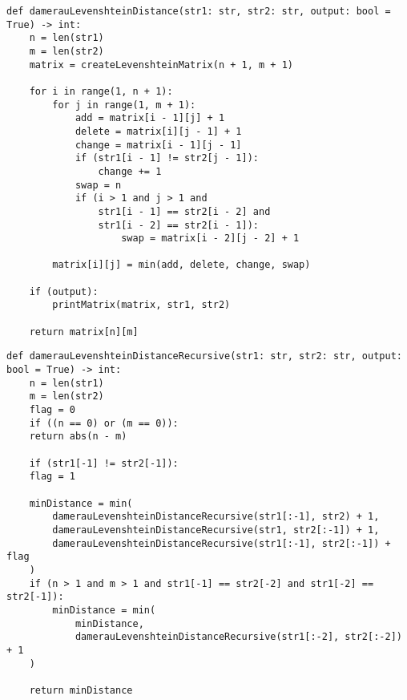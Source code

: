 \begin{center}
    \captionsetup{justification=raggedright,singlelinecheck=off}
    \begin{lstlisting}[label=lst:dam_lev_mat,caption=Реализация алгоритма нахождения расстояния Дамерау-Левенштейна (матричного)]
def damerauLevenshteinDistance(str1: str, str2: str, output: bool = True) -> int:
	n = len(str1)
	m = len(str2)
	matrix = createLevenshteinMatrix(n + 1, m + 1)
	
	for i in range(1, n + 1):
		for j in range(1, m + 1):
			add = matrix[i - 1][j] + 1
			delete = matrix[i][j - 1] + 1
			change = matrix[i - 1][j - 1]
			if (str1[i - 1] != str2[j - 1]):
				change += 1
			swap = n
			if (i > 1 and j > 1 and
				str1[i - 1] == str2[i - 2] and
				str1[i - 2] == str2[i - 1]):
					swap = matrix[i - 2][j - 2] + 1
		
		matrix[i][j] = min(add, delete, change, swap)
	
	if (output):
		printMatrix(matrix, str1, str2)
	
	return matrix[n][m]
\end{lstlisting}
\end{center}


\begin{center}
    \captionsetup{justification=raggedright,singlelinecheck=off}
    \begin{lstlisting}[label=lst:dam_lev_rec,caption=Реализация алгоритма нахождения расстояния Дамерау-Левенштейна (рекурсивного)]
def damerauLevenshteinDistanceRecursive(str1: str, str2: str, output: bool = True) -> int:
	n = len(str1)
	m = len(str2)
	flag = 0
	if ((n == 0) or (m == 0)):
	return abs(n - m)
	
	if (str1[-1] != str2[-1]):
	flag = 1
	
	minDistance = min(
		damerauLevenshteinDistanceRecursive(str1[:-1], str2) + 1,
		damerauLevenshteinDistanceRecursive(str1, str2[:-1]) + 1,
		damerauLevenshteinDistanceRecursive(str1[:-1], str2[:-1]) + flag
	)
	if (n > 1 and m > 1 and str1[-1] == str2[-2] and str1[-2] == str2[-1]):
		minDistance = min(
			minDistance,
			damerauLevenshteinDistanceRecursive(str1[:-2], str2[:-2]) + 1
	)
	
	return minDistance
\end{lstlisting}
\end{center}


